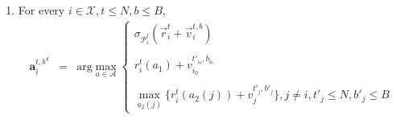 \begin{enumerate}
	\item For every $i \in \mathcal{X}, t \leq N, b \leq B$,
	\begin{eqnarray*}
	{\textbf{a}_{i}^{t,b}}^\epsilon &=& \textrm{arg}\max_{a \in \mathcal{A}}
    	\begin{cases}
    	\sigma_{\mathcal{P}_{i}^{t}}(\vec{r}_{i}^{t} + \vec{v}_{i}^{t,b})\\ \\
    	r_{i}^{t}(a_1) + v_{i_0}^{t'_{i_0},b_{i_0}} \\ \\
    	\max_{a_2(j)} \bigg\{r_{i}^{t}(a_2(j)) + v_{j}^{t'_{j},b'_{j}}\bigg\}, j \neq i, t'_{j} \leq N, b'_{j} \leq B
    	\end{cases}
	\end{eqnarray*}
\end{enumerate}




